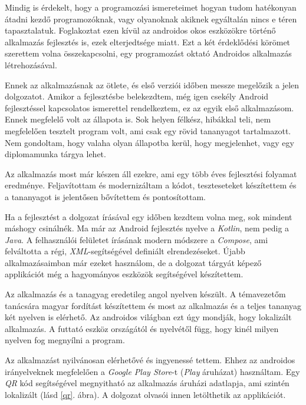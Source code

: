 \documentclass[12pt,a4paper]{article}
\newcommand{\xml}{\textit{XML}\xspace}
\begin{document}
	Mindig is érdekelt, hogy a programozási ismereteimet hogyan tudom hatékonyan átadni kezdő programozóknak, vagy olyanoknak akiknek egyáltalán nincs e téren tapasztalatuk. Foglakoztat ezen kívül az androidos okos eszközökre történő alkalmazás fejlesztés is, ezek elterjedtsége miatt. Ezt a két érdeklődési körömet szerettem volna összekapcsolni, egy programozást oktató Androidos alkalmazás létrehozásával.
	
	Ennek az alkalmazásnak az ötlete, és első verziói időben messze megelőzik a jelen dolgozatot. Amikor a fejlesztésbe belekezdtem, még igen csekély Android fejlesztéssel kapcsolatos ismerettel rendelkeztem, ez az egyik első alkalmazásom. Ennek megfelelő volt az állapota is. Sok helyen félkész, hibákkal teli, nem megfelelően 
	tesztelt program volt, ami csak egy rövid tananyagot tartalmazott. Nem gondoltam, hogy valaha olyan állapotba kerül, hogy megjelenhet, vagy egy diplomamunka tárgya lehet.
	
	Az alkalmazás most már készen áll ezekre, ami egy több éves fejlesztési folyamat eredménye. Feljavítottam és modernizáltam a kódot, teszteseteket készítettem és a tananyagot is jelentősen bővítettem és pontosítottam.
	
	Ha a fejlesztést a dolgozat írásával egy időben kezdtem volna meg, sok mindent máshogy csinálnék. Ma már az Android fejlesztés nyelve a \textit{Kotlin}, nem pedig a \textit{Java}. A felhasználói felületet írásának modern módszere a \textit{Compose}, ami felváltotta a régi, \xml-segítségével definiált elrendezéseket. 
	Újabb alkalmazásaimban már ezeket használom, de a dolgozat tárgyát képező applikációt még a hagyományos eszközök segítségével készítettem.
	
	Az alkalmazás és a tanagyag eredetileg angol nyelven készült. A témavezetőm tanácsára magyar fordítást készítettem és most az alkalmazás és a teljes tananyag két nyelven is elérhető. Az androidos világban ezt úgy mondják, hogy lokalizált alkalmazás. A futtató eszköz országától és nyelvétől függ, hogy kinél milyen 
	nyelven fog megnyílni a program.
	
	Az alkalmazást nyilvánosan elérhetővé és ingyenessé tettem. Ehhez az androidos irányelveknek megfelelően a \textit{Google Play Store}-t (\textit{Play} áruházat) használtam. Egy \textit{QR} kód segítségével megnyitható az alkalmazás áruházi adatlapja, ami szintén lokalizált (lásd \ref{qr}. ábra). A dolgozat olvasói innen letölthetik az applikációt.
	
\end{document}
